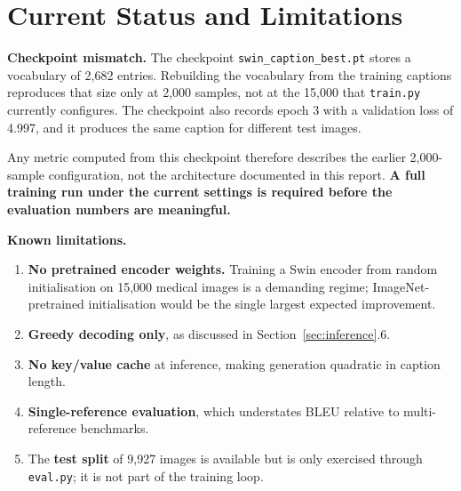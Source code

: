 \documentclass[12pt]{article}
\newcommand{\code}[1]{\texttt{#1}}
\begin{document}
\section{Current Status and Limitations}

\textbf{Checkpoint mismatch.} The checkpoint \code{swin\_caption\_best.pt} stores a vocabulary of 2,682 entries. Rebuilding the vocabulary from the training captions reproduces that size only at 2,000 samples, not at the 15,000 that \code{train.py} currently configures. The checkpoint also records epoch 3 with a validation loss of 4.997, and it produces the same caption for different test images.

Any metric computed from this checkpoint therefore describes the earlier 2,000-sample configuration, not the architecture documented in this report. \textbf{A full training run under the current settings is required before the evaluation numbers are meaningful.}

\textbf{Known limitations.}
\begin{enumerate}[nosep]
\item \textbf{No pretrained encoder weights.} Training a Swin encoder from random initialisation on 15,000 medical images is a demanding regime; ImageNet-pretrained initialisation would be the single largest expected improvement.
\item \textbf{Greedy decoding only}, as discussed in Section~\ref{sec:inference}.6.
\item \textbf{No key/value cache} at inference, making generation quadratic in caption length.
\item \textbf{Single-reference evaluation}, which understates BLEU relative to multi-reference benchmarks.
\item The \textbf{test split} of 9,927 images is available but is only exercised through \code{eval.py}; it is not part of the training loop.
\end{enumerate}
\end{document}

